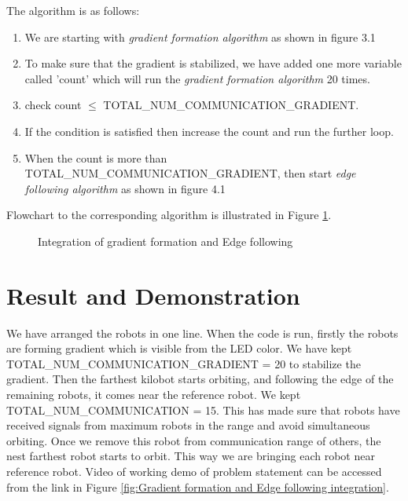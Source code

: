 \documentclass{report}[12pt]
\begin{document}
The algorithm is as follows:
\begin{enumerate}
    \item We are starting with {\textit{gradient formation algorithm}} as shown in figure 3.1
    \item To make sure that the gradient is stabilized, we have added one more variable called 'count' which will run the {\textit{gradient formation algorithm}} 20 times.
    \item check count $\leq$ TOTAL\_NUM\_COMMUNICATION\_GRADIENT.
    \item If the condition is satisfied then increase the count and run the further loop.
    \item When the count is more than TOTAL\_NUM\_COMMUNICATION\_GRADIENT, then start {\textit{edge following algorithm}} as shown in figure 4.1
\end{enumerate}
Flowchart to the corresponding algorithm is illustrated in Figure \ref{fig:Flowchart for integration of gradient formation and Edge following}.

\begin{figure}[H]
	\centering
	\caption{Integration of gradient formation and Edge following}
	\label{fig:Flowchart for integration of gradient formation and Edge following}
\end{figure}

\section{Result and Demonstration}
We have arranged the robots in one line. When the code is run, firstly the robots are forming gradient which is visible from the LED color. We have kept TOTAL\_NUM\_COMMUNICATION\_GRADIENT = 20 to stabilize the gradient. Then the farthest kilobot starts orbiting, and following the edge of the remaining robots, it comes near the reference robot. We kept TOTAL\_NUM\_COMMUNICATION = 15. This has made sure that robots have received signals from maximum robots in the range and avoid simultaneous orbiting.
Once we remove this robot from communication range of others, the nest farthest robot starts to orbit.
This way we are bringing each robot near reference robot. 
Video of working demo of problem statement can be accessed from the link in Figure \ref{fig:Gradient formation and Edge following integration}.
\end{document}
